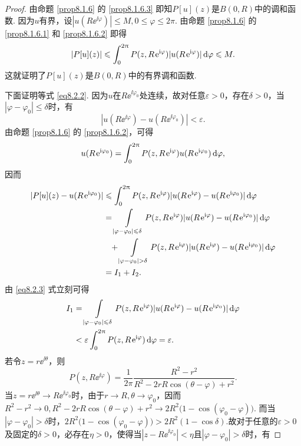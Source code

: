 \begin{proof}
由命题 \ref{prop8.1.6} 的 \ref{prop8.1.6.3} 即知$P[u](z)$是$B(0,R)$中的调和函数. 因为$u$有界，设$|u(R\ee^{\ii\varphi})|\le M,0\le\varphi\le2\pi$. 由命题 \ref{prop8.1.6} 的 \ref{prop8.1.6.1} 和 \ref{prop8.1.6.2} 即得
\[|P[u](z)|\leqslant\int_0^{2\uppi}P(z,R\operatorname{\!\!\;\mathrm e}^{\mathrm i\varphi})|u(R\operatorname{\!\!\;\mathrm e}^{\mathrm i\varphi})|\mathop{}\!\mathrm{d} \varphi\leqslant M.\]
这就证明了$P[u](z)$是$B(0,R)$中的有界调和函数.

下面证明等式 \eqref{eq8.2.2}. 因为$u$在$R\ee^{\ii\varphi_0}$处连续，故对任意$\varepsilon>0$，存在$\delta>0$，当$|\varphi-\varphi_0|\le\delta$时，有
\begin{equation}\label{eq8.2.3}
|u(R\ee^{\ii\varphi})-u(R\ee^{\ii\varphi_0})|<\varepsilon.
\end{equation}
由命题 \ref{prop8.1.6} 的 \ref{prop8.1.6.2}，可得
\[u(R\operatorname{\!\!\;\mathrm e}^{\mathrm i\varphi_0})=\int_0^{2\uppi}P(z,R\operatorname{\!\!\;\mathrm e}^{\mathrm i\varphi})u(R\operatorname{\!\!\;\mathrm e}^{\mathrm i\varphi_0})
\mathop{}\!\mathrm{d} \varphi,\]
因而
\begin{align*}
|P[u](z)-u(R\ee^{\ii\varphi_0})|&\le\int_0^{2\pi}P(z,R\ee^{\ii\varphi})|u(R\ee^{\ii\varphi})-u(R\ee^{\ii\varphi_0})|
\dif \varphi\\
&=\int\limits_{|\varphi-\varphi_0|\le\delta}P(z,R\ee^{\ii\varphi})|u(R\ee^{\ii\varphi})
-u(R\ee^{\ii\varphi_0})|\dif \varphi\\
&\phantom{=}+\int\limits_{|\varphi-\varphi_0|>\delta}P(z,R\ee^{\ii\varphi})|u(R\ee^{\ii\varphi})
-u(R\ee^{\ii\varphi_0})|\dif \varphi\\
&=I_1+I_2.
\end{align*}
由 \eqref{eq8.2.3} 式立刻可得
\begin{equation}\label{eq8.2.4}
\begin{aligned}
I_1&=\int\limits_{|\varphi-\varphi_0|\le\delta}P(z,R\ee^{\ii\varphi})|u(R\ee^{\ii\varphi})
-u(R\ee^{\ii\varphi_0})|\dif \varphi\\
&<\varepsilon\int_0^{2\pi}P(z,R\ee^{\ii\varphi})\dif \varphi=\varepsilon.
\end{aligned}
\end{equation}
若令$z=r\ee^{\ii\theta}$，则
\[P(z,R\ee^{\ii\varphi})=\frac1{2\pi}\frac{R^2-r^2}{R^2-2rR\cos(\theta-\varphi)+r^2}.\]
当$z=r\ee^{\ii\theta}\to R\ee^{\ii\varphi_0}$时，由于$r\to R,\theta\to\varphi_0$，因而$R^2-r^2\to0,R^2-2rR\cos(\theta-\varphi)+r^2\to2R^2\big(1-\cos(\varphi_0-\varphi)\big)$. 而当$|\varphi-\varphi_0|>\delta$时，$2R^2\big(1-\cos(\varphi_0-\varphi)\big)>2R^2(1-\cos\delta)$.故对于任意的$\varepsilon>0$及固定的$\delta>0$，必存在$\eta>0$，使得当$|z-R\ee^{\ii\varphi_0}|<\eta$且$|\varphi-\varphi_0|>\delta$时，有

\end{proof}
